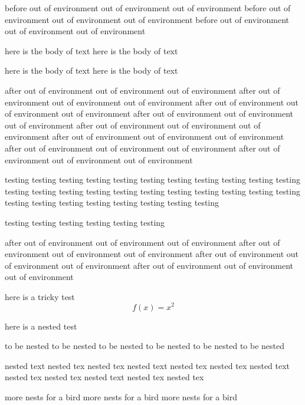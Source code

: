 before out of environment out of environment out of environment
before out of environment out of environment out of environment
before out of environment out of environment out of environment
\begin{myenvironment}

  here is the body of text
  here is the body of text

  here is the body of text
  here is the body of text

\end{myenvironment}
after out of environment out of environment out of environment
after out of environment out of environment out of environment
after out of environment out of environment out of environment
after out of environment out of environment out of environment
after out of environment out of environment out of environment
after out of environment out of environment out of environment
after out of environment out of environment out of environment
after out of environment out of environment out of environment
\begin{anothertest}

  testing testing testing testing testing testing
  testing testing testing testing testing testing
  testing testing testing testing testing testing
  testing testing testing testing testing testing
  testing testing testing testing testing testing

  
  testing testing testing testing testing testing

\end{anothertest}
after out of environment out of environment out of environment
after out of environment out of environment out of environment
after out of environment out of environment out of environment
after out of environment out of environment out of environment

here is a tricky test \begin{equation*}f(x)=x^2\end{equation*}

here is a nested test
\begin{nestedenv}
  to be nested to be nested
  to be nested to be nested
  to be nested to be nested
  \begin{thenestedenv}
    nested text nested tex nested tex
    nested text nested tex nested tex
    nested text nested tex nested tex
    nested text nested tex nested tex
    \begin{anothernest}
      more nests for a bird
      more nests for a bird
      more nests for a bird
    \end{anothernest}
  \end{thenestedenv}
\end{nestedenv}
